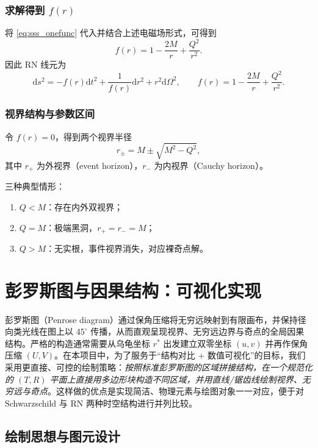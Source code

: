 \documentclass[a4paper,12pt]{article}
\begin{document}
\subsubsection{求解得到 $f(r)$}
将 \eqref{eq:sss_onefunc} 代入并结合上述电磁场形式，可得到
\begin{equation}
f(r)=1-\frac{2M}{r}+\frac{Q^2}{r^2}.
\end{equation}
因此 RN 线元为
\begin{equation}
\mathrm{d}s^2=-f(r)\mathrm{d}t^2+\frac{1}{f(r)}\mathrm{d}r^2+r^2\mathrm{d}\Omega^2,
\qquad
f(r)=1-\frac{2M}{r}+\frac{Q^2}{r^2}.
\end{equation}

\subsubsection{视界结构与参数区间}
令 $f(r)=0$，得到两个视界半径
\begin{equation}
r_{\pm}=M\pm\sqrt{M^2-Q^2},
\end{equation}
其中 $r_+$ 为外视界（event horizon），$r_-$ 为内视界（Cauchy horizon）。

三种典型情形：
\begin{enumerate}
\item $Q<M$：存在内外双视界；
\item $Q=M$：极端黑洞，$r_+=r_-=M$；
\item $Q>M$：无实根，事件视界消失，对应裸奇点解。
\end{enumerate}


\section{彭罗斯图与因果结构：可视化实现}

彭罗斯图（Penrose diagram）通过保角压缩将无穷远映射到有限画布，并保持径向类光线在图上以 $45^\circ$ 传播，从而直观呈现视界、无穷远边界与奇点的全局因果结构。严格的构造通常需要从乌龟坐标 $r^*$ 出发建立双零坐标 $(u,v)$ 并再作保角压缩 $(U,V)$。在本项目中，为了服务于“结构对比 + 数值可视化”的目标，我们采用更直接、可控的绘制策略：\emph{按照标准彭罗斯图的区域拼接结构，在一个规范化的 $(T,R)$ 平面上直接用多边形块构造不同区域，并用直线/锯齿线绘制视界、无穷远与奇点}。这样做的优点是实现简洁、物理元素与绘图对象一一对应，便于对 Schwarzschild 与 RN 两种时空结构进行并列比较。

\subsection{绘制思想与图元设计}
\end{document}
